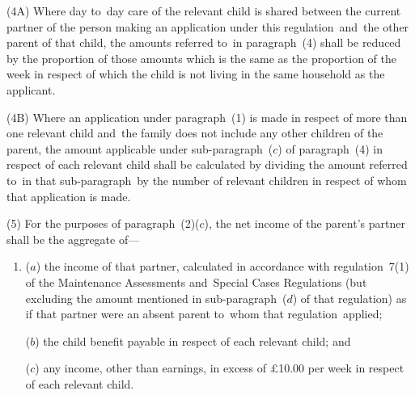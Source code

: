 \documentclass[12pt,a4paper]{article}
\begin{document}
(4A) Where day to~day care of the relevant child is shared between the current partner of the person making an application under this regulation~and~the other parent of that child, the amounts referred to~in paragraph~(4) shall be reduced by the proportion of those amounts which is the same as the proportion of the week in respect of which the child is not living in the same household as the applicant.

(4B) Where an application under paragraph~(1) is made in respect of more than one relevant child and~the family does not include any other children of the parent, the amount applicable under sub-paragraph~($c$) of paragraph~(4) in respect of each relevant child shall be calculated by dividing the amount referred to~in that sub-paragraph~by the number of relevant children in respect of whom that application is made.

(5) For the purposes of paragraph~(2)($c$), the net income of the parent’s partner
shall be the aggregate of—
\begin{enumerate}\item[]
($a$) the income of that partner, calculated in accordance with regulation~7(1) of
the Maintenance Assessments and~Special Cases Regulations (but excluding the
amount mentioned in sub-paragraph~($d$) of that regulation) as if that partner
were an absent parent to~whom that regulation~applied;

($b$) the child benefit payable in respect of each relevant child; and

($c$) any income, other than earnings, in excess of £10.00 per week in respect of
each relevant child.
\end{enumerate}
\end{document}
